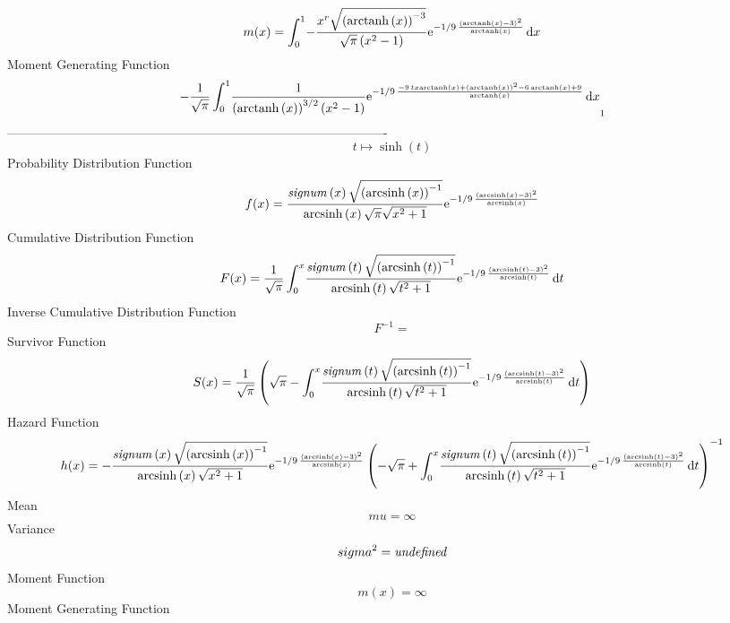 \documentclass[12pt]{article}
\begin{document}
 $$ m(x) = \int_{0}^{1}\!-{\frac {{x}^{r}\sqrt { \left( {\rm arctanh} \left(x
\right) \right) ^{-3}}}{\sqrt {\pi} \left( {x}^{2}-1 \right) }{{\rm e}
^{-1/9\,{\frac { \left( {\rm arctanh} \left(x\right)-3 \right) ^{2}}{
{\rm arctanh} \left(x\right)}}}}}\,{\rm d}x
$$ Moment Generating Function 
 $$-{\frac {1}{\sqrt {\pi}}\int_{0}^{1}\!{\frac {1}{ \left( {\rm arctanh}
 \left(x\right) \right) ^{3/2} \left( {x}^{2}-1 \right) }{{\rm e}^{-1/
9\,{\frac {-9\,tx{\rm arctanh} \left(x\right)+ \left( {\rm arctanh} 
\left(x\right) \right) ^{2}-6\,{\rm arctanh} \left(x\right)+9}{
{\rm arctanh} \left(x\right)}}}}}\,{\rm d}x}_{{1}}
$$-------------------------------------------------------------------------------------------  \\$$t\mapsto \sinh \left( t \right) 
$$Probability Distribution Function 
$$  f(x)={\frac {{\it signum} \left( x \right) \sqrt { \left( {\rm arcsinh} 
\left(x\right) \right) ^{-1}}}{{\rm arcsinh} \left(x\right)\sqrt {\pi}
\sqrt {{x}^{2}+1}}{{\rm e}^{-1/9\,{\frac { \left( {\rm arcsinh} \left(
x\right)-3 \right) ^{2}}{{\rm arcsinh} \left(x\right)}}}}}
$$Cumulative Distribution Function  
 $$F(x)={\frac {1}{\sqrt {\pi}}\int_{0}^{x}\!{\frac {{\it signum} \left( t
 \right) \sqrt { \left( {\rm arcsinh} \left(t\right) \right) ^{-1}}}{
{\rm arcsinh} \left(t\right)\sqrt {{t}^{2}+1}}{{\rm e}^{-1/9\,{\frac {
 \left( {\rm arcsinh} \left(t\right)-3 \right) ^{2}}{{\rm arcsinh} 
\left(t\right)}}}}}\,{\rm d}t}
$$ Inverse Cumulative Distribution Function 
  $$F^{-1} = $$Survivor Function 
 $$ S(x)={\frac {1}{\sqrt {\pi}} \left( \sqrt {\pi}-\int_{0}^{x}\!{\frac {{\it 
signum} \left( t \right) \sqrt { \left( {\rm arcsinh} \left(t\right)
 \right) ^{-1}}}{{\rm arcsinh} \left(t\right)\sqrt {{t}^{2}+1}}{
{\rm e}^{-1/9\,{\frac { \left( {\rm arcsinh} \left(t\right)-3 \right) 
^{2}}{{\rm arcsinh} \left(t\right)}}}}}\,{\rm d}t \right) }
$$ Hazard Function 
 $$ h(x)=-{\frac {{\it signum} \left( x \right) \sqrt { \left( {\rm arcsinh} 
\left(x\right) \right) ^{-1}}}{{\rm arcsinh} \left(x\right)\sqrt {{x}^
{2}+1}}{{\rm e}^{-1/9\,{\frac { \left( {\rm arcsinh} \left(x\right)-3
 \right) ^{2}}{{\rm arcsinh} \left(x\right)}}}} \left( -\sqrt {\pi}+
\int_{0}^{x}\!{\frac {{\it signum} \left( t \right) \sqrt { \left( 
{\rm arcsinh} \left(t\right) \right) ^{-1}}}{{\rm arcsinh} \left(t
\right)\sqrt {{t}^{2}+1}}{{\rm e}^{-1/9\,{\frac { \left( {\rm arcsinh}
 \left(t\right)-3 \right) ^{2}}{{\rm arcsinh} \left(t\right)}}}}}
\,{\rm d}t \right) ^{-1}}
$$Mean 
 $$ mu=\infty 
$$ Variance 
 $$ sigma^2 = {\it undefined}
$$Moment Function 
 $$ m(x) = \infty 
$$ Moment Generating Function 
\end{document}
